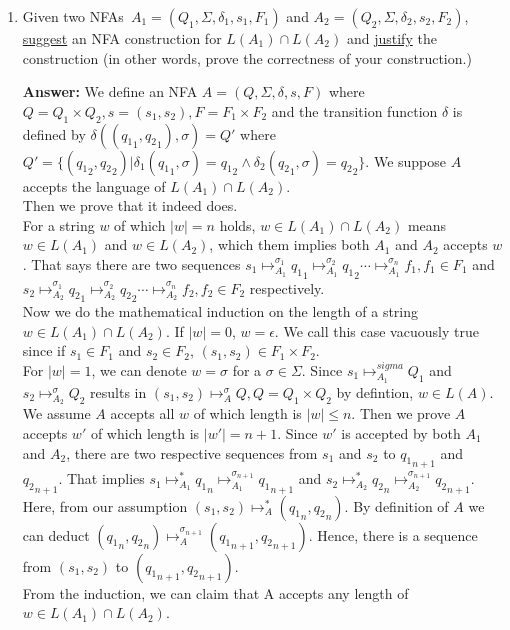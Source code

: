 \documentclass[paper=a4, fontsize=11pt]{scrartcl}
\begin{document}
\begin{enumerate}
\begin{enumerate}
\begin{enumerate}
	\end{enumerate}
\end{enumerate}

\newpage

\item Given two NFAs~$A_1 = (Q_1, \Sigma, \delta_1, s_1, F_1)$ and
$A_2 = (Q_2, \Sigma, \delta_2, s_2, F_2)$, \underline{suggest} an 
NFA construction for $L(A_1) \cap L(A_2)$ and \underline{justify} the
construction (in other words, prove the correctness of your
construction.)

\vspace{1cm}
\textbf{Answer:}
We define an NFA $A=(Q, \Sigma, \delta, s, F)$ where $Q=Q_1 \times Q_2, s = (s_1, s_2), F = F_1 \times F_2$ and the transition function $\delta$ is defined by $\delta (({q_1}_1, {q_2}_1), \sigma) = Q'$ where $Q' = \{ ({q_1}_2, {q_2}_2) | \delta_1 ({q_1}_1, \sigma) = {q_1}_2  \land \delta_2 ({q_2}_1, \sigma) = {q_2}_2 \}$. We suppose $A$ accepts the language of $L(A_1) \cap L(A_2)$.\\
Then we prove that it indeed does.\\
For a string $w$ of which $|w| = n$ holds, $w \in L(A_1) \cap L(A_2)$ means $w \in L(A_1)$ and $w \in L(A_2)$, which them implies both $A_1$ and $A_2$ accepts $w$. That says there are two sequences $s_1 \mapsto_{A_1}^{\sigma_1} {q_1}_1 \mapsto_{A_1}^{\sigma_2} {q_1}_2 \cdots \mapsto_{A_1}^{\sigma_n} f_1, f_1 \in F_1$ and $s_2 \mapsto_{A_2}^{\sigma_1} {q_2}_1 \mapsto_{A_2}^{\sigma_2} {q_2}_2 \cdots \mapsto_{A_2}^{\sigma_n} f_2, f_2 \in F_2$ respectively.\\
Now we do the mathematical induction on the length of a string $w \in L(A_1) \cap L(A_2)$. If $|w| = 0$, $w = \epsilon$. We call this case vacuously true since if $s_1 \in F_1$ and $s_2 \in F_2$, $(s_1, s_2) \in F_1 \times F_2$.\\
For $|w| = 1$, we can denote $w = \sigma$ for a $\sigma \in \Sigma$. Since $s_1 \mapsto_{A_1}^{sigma} Q_1$ and $s_2 \mapsto_{A_2}^{\sigma} Q_2$ results in $(s_1, s_2) \mapsto_{A}^{\sigma} Q, Q = Q_1 \times Q_2$ by defintion, $w \in L(A)$.\\
We assume $A$ accepts all $w$ of which length is $|w| \le n$. Then we prove $A$ accepts $w'$ of which length is $|w'| = n+1$.
Since $w'$ is accepted by both $A_1$ and $A_2$, there are two respective sequences from $s_1$ and $s_2$ to ${q_1}_{n+1}$  and ${q_2}_{n+1}$. That implies $s_1 \mapsto_{A_1}^* {q_1}_n \mapsto_{A_1}^{\sigma_{n+1}} {q_1}_{n+1}$ and $s_2 \mapsto_{A_2}^* {q_2}_n \mapsto_{A_2}^{\sigma_{n+1}} {q_2}_{n+1}$. Here, from our assumption $(s_1,s_2) \mapsto_{A}^* ({q_1}_n, {q_2}_n)$. By definition of $A$ we can deduct $({q_1}_n, {q_2}_n) \mapsto_A^{\sigma_{n+1}} ({q_1}_{n+1}, {q_2}_{n+1})$. Hence, there is a sequence from $(s_1, s_2)$ to $({q_1}_{n+1}, {q_2}_{n+1})$.\\
From the induction, we can claim that A accepts any length of $w \in L({A_1}) \cap L({A_2})$.



\end{enumerate}
\end{document}
